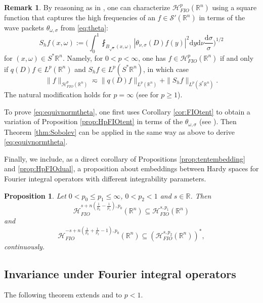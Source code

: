 \documentclass{amsart}
\newcommand {\ud}{\mathrm{d}}
\newcommand {\HT}{\mathcal{H}}
\newcommand {\Hp}{\mathcal{H}^{p}_{FIO}(\Rn)}
\newcommand {\R}{\mathbb R}
\newcommand {\Rn}{\mathbb{R}^{n}}
\newcommand {\Sp}{S^{*}\Rn}
\newcommand {\Sw}{\mathcal{S}}
\newcommand {\w}{\omega}
\newtheorem{proposition}[theorem]{Proposition}
\theoremstyle{definition}
\newtheorem{remark}[theorem]{Remark}
\numberwithin{equation}{section}
\begin{document}
\begin{remark}\label{rem:equivnorm}
By reasoning as in \cite[Section 3.2]{Rozendaal21}, one can characterize $\Hp$ using a square function that captures the high frequencies of an $f\in\Sw'(\Rn)$ in terms of the wave packets $\theta_{\w,\sigma}$ from \eqref{eq:theta}:
\begin{equation}\label{eq:defS}
S_{h}f(x,\w):=\Big(\int_{0}^{1}\fint_{B_{\sqrt{\sigma}}(x,\w)}|\theta_{\nu,\sigma}(D)f(y)|^{2}\ud y\ud\nu\frac{\ud\sigma}{\sigma}\Big)^{1/2}
\end{equation}
for $(x,\w)\in\Sp$. Namely, for $0<p<\infty$, one has $f\in\Hp$ if and only if $q(D)f\in L^{p}(\Rn)$ and $S_{h}f\in L^{p}(\Sp)$, in which case
\begin{equation}\label{eq:equivnormtheta}
\|f\|_{\Hp}\eqsim \|q(D)f\|_{L^{p}(\Rn)}+\|S_{h}f\|_{L^{p}(\Sp)}.
\end{equation}
The natural modification holds for $p=\infty$ (see \cite[Corollary 3.8]{Rozendaal21} for $p\geq1$).

To prove \eqref{eq:equivnormtheta}, one first uses Corollary \ref{cor:FIOtent} to obtain a variation 
of Proposition \ref{prop:HpFIOtent} in terms of the $\theta_{\w,\sigma}$ (see \cite[Proposition 3.6]{Rozendaal21}). Then Theorem \ref{thm:Sobolev} can be applied in the same way as above to derive \eqref{eq:equivnormtheta}. 
\end{remark}


Finally, we include, as a direct corollary of Propositions \ref{prop:tentembedding} and \ref{prop:HpFIOdual}, a proposition about embeddings between Hardy spaces for Fourier integral operators with different integrability parameters.

\begin{proposition}\label{prop:fracintHpFIO}
Let $0<p_{0}\leq p_{1}\leq \infty$, $0<p_{2}<1$ and $s\in\R$. Then 
\[
\HT^{s+n(\frac{1}{p_{0}}-\frac{1}{p_{1}}),p_{0}}_{FIO}(\Rn)\subseteq \HT^{s,p_{1}}_{FIO}(\Rn)
\]
and 
\[
\HT^{-s+n(\frac{1}{p_{0}}+\frac{1}{p_{2}}-1),p_{0}}_{FIO}(\Rn)\subseteq (\HT^{s,p_{2}}_{FIO}(\Rn))^{*},
\]
continuously.
\end{proposition}




\subsection{Invariance under Fourier integral operators}\label{subsec:invariance`}

The following theorem extends \cite[Theorem 6.10]{HaPoRo20} and \cite[Proposition 3.3]{Rozendaal22} to $p<1$.
\end{document}
